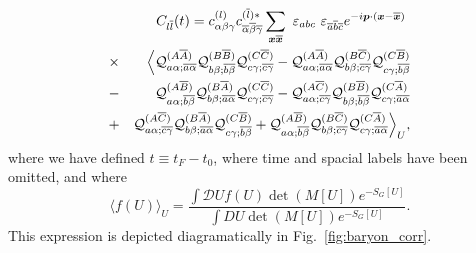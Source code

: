 \begin{eqnarray*}
&&C_{l\overline{l}}(t)
= c^{(l)}_{\alpha\beta\gamma}
c^{(\overline{l})\ast}_{
\overline{\alpha}\overline{\beta}\overline{\gamma}}
\sum_{\boldsymbol{x}\overline{\boldsymbol{x}}}\ \varepsilon_{abc}
\   \varepsilon_{\overline{a}\overline{b}\overline{c}} 
e^{-i\boldsymbol{p}\cdot(\boldsymbol{x}-\overline{\boldsymbol{x}})}\  \nonumber\\
&\times& \Bigl\langle {\cal Q}^{(A\overline{A})}_{
a\alpha ;\overline{a}\overline{\alpha}}
{\cal Q}^{(B\overline{B})}_{b\beta ;\overline{b}\overline{\beta}}
{\cal Q}^{(C\overline{C})}_{c\gamma ;\overline{c}\overline{\gamma}}
-{\cal Q}^{(A\overline{A})}_{a\alpha;\overline{a}\overline{\alpha}}
{\cal Q}^{(B\overline{C})}_{b\beta   ;\overline{c}\overline{\gamma}}
{\cal Q}^{(C\overline{B})}_{c\gamma ;\overline{b}\overline{\beta}}
\nonumber\\
&-&{\cal Q}^{(A\overline{B})}_{a\alpha;\overline{b}\overline{\beta}}
{\cal Q}^{(B\overline{A})}_{b\beta  ;\overline{a}\overline{\alpha}}
{\cal Q}^{(C\overline{C})}_{c\gamma ;\overline{c}\overline{\gamma}}
- {\cal Q}^{(A\overline{C})}_{a\alpha;\overline{c}\overline{\gamma}}
{\cal Q}^{(B\overline{B})}_{b\beta ;\overline{b}\overline{\beta}}
{\cal Q}^{(C\overline{A})}_{c\gamma ;\overline{a}\overline{\alpha}}
\nonumber\\
&+&
{\cal Q}^{(A\overline{C})}_{a\alpha;\overline{c}\overline{\gamma}}
{\cal Q}^{(B\overline{A})}_{b\beta ;\overline{a}\overline{\alpha}}
{\cal Q}^{(C\overline{B})}_{c\gamma ;\overline{b}\overline{\beta}}
+{\cal Q}^{(A\overline{B})}_{a\alpha;\overline{b}\overline{\beta}}
{\cal Q}^{(B\overline{C})}_{b\beta ;\overline{c}\overline{\gamma}}
{\cal Q}^{(C\overline{A})}_{c\gamma ;\overline{a}\overline{\alpha}}
\Bigr\rangle_U,
\end{eqnarray*}
where we have defined $t\equiv t_F - t_0$, where time and spacial labels have been omitted, and where
\begin{equation}
    \langle f(U)\rangle_{U}=\frac{\int \mathcal{D} U f(U) \operatorname{det}(M[U]) e^{-S_{G}[U]}}{\int D U \operatorname{det}(M[U]) e^{-S_{G}[U]}}.
\end{equation}
This expression is depicted diagramatically in Fig.~\ref{fig:baryon_corr}.


